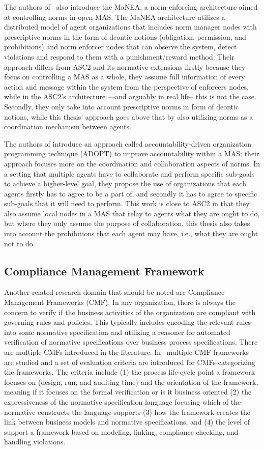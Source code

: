 The authors of~\cite{criado2013manea} also introduce the MaNEA, a norm-enforcing architecture aimed at controlling norms in open MAS. The MaNEA architecture utilizes a distributed model of agent organizations that includes norm manager nodes with prescriptive norms in the form of deontic notions (obligation, permission, and prohibitions) and norm enforcer nodes that can observe the system, detect violations and respond to them with a punishment/reward method. Their approach differs from ASC2 and its normative extensions firstly because they focus on controlling a MAS as a whole, they assume full information of every action and message within the system from the perspective of enforcers nodes, while in the ASC2's architecture —and arguably in real life--  this is not the case. Secondly, they only take into account prescriptive norms in form of deontic notions, while this thesis' approach goes above that by also utilizing norms as a coordination mechanism between agents.


The authors of \cite{Baldoni2018} introduce an approach called accountability-driven organization programming technique (ADOPT) to improve accountability within a MAS; their approach focuses more on the coordination and collaboration aspects of norms. In a setting that multiple agents have to collaborate and perform specific sub-goals to achieve a higher-level goal, they propose the use of organizations that each agents firstly has to agree to be a part of, and secondly it has to agree to specific sub-goals that it will need to perform. This work is close to ASC2 in that they also assume local nodes in a MAS that relay to agents what they are ought to do, but where they only assume the purpose of collaboration, this thesis also takes into account the prohibitions that each agent may have, i.e., what they are ought not to do.

\subsection{Compliance Management Framework}
Another related research domain that should be noted are Compliance Management Frameworks (CMF). In any organization, there is always the concern to verify if the business activities of the organization are compliant with governing rules and policies. This typically includes encoding the relevant rules into some normative specification and utilizing a reasoner for automated verification of normative specifications over business process specifications. There are multiple CMFs introduced in the literature. In~\cite{Hashmi2018c,Hashmi2018b} multiple CMF frameworks are studied and a set of evaluation criteria are introduced for CMFs categorizing the frameworks. The criteria include (1) the process life-cycle point a framework focuses on (design, run, and auditing time) and the orientation of the framework, meaning if it focuses on the formal verification or is it business oriented (2) the expressiveness of the normative specification language focusing which of the normative constructs the language supports (3) how the framework creates the link between business models and normative specifications, and (4) the level of support a framework based on modeling, linking, compliance checking, and handling violations.

